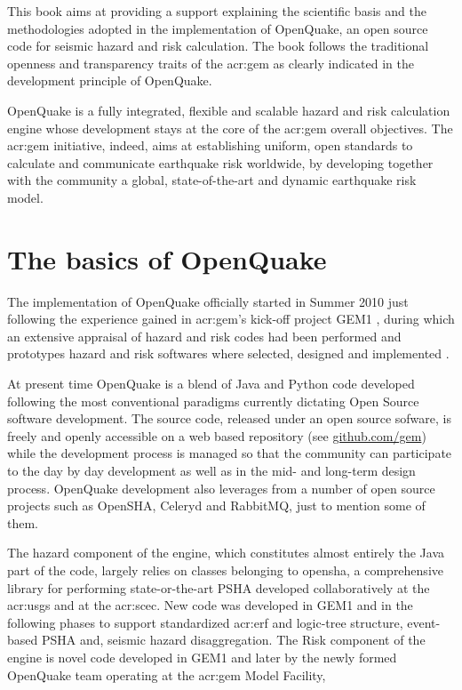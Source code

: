 This book aims at providing a support explaining the scientific basis 
and the methodologies adopted in the implementation of OpenQuake, an open 
source code for seismic hazard and risk calculation. 
%
The book follows the traditional openness and transparency traits of the 
\gls{acr:gem} as clearly indicated in the development principle of 
OpenQuake. 

OpenQuake is a fully integrated, flexible and scalable hazard and risk 
calculation engine whose development stays at the core of the \gls{acr:gem} 
overall objectives.
%
The \gls{acr:gem} initiative, indeed, aims at establishing uniform, open 
standards to calculate and communicate earthquake risk worldwide, by 
developing together with the community a global, state-of-the-art and 
dynamic earthquake risk model. 
%
\section{The basics of OpenQuake}
The implementation of OpenQuake officially started in Summer 2010 just 
following the experience gained in \gls{acr:gem}'s kick-off project GEM1 
\citep{gemfoundation2010}, during which an extensive appraisal of hazard 
and risk codes had been performed \citep{danciu2010,crowley2010}
and prototypes hazard and risk softwares where selected, designed and
implemented \citep{pagani2010,crowley2010a}.

At present time OpenQuake is a blend of Java and Python code developed 
following the most conventional paradigms currently dictating Open Source 
software development. 
The source code, released under an open source sofware,
is freely and openly accessible on a web based repository 
(see \href{http://github.com/gem}{github.com/gem}) while the 
development process is managed so that the community can participate 
to the day by day development as well as in the mid- and long-term 
design process. 
%
OpenQuake development also leverages from a number of open source projects 
such as OpenSHA, Celeryd and RabbitMQ, just to mention some of them.

The hazard component of the engine, which constitutes almost entirely
the Java part of the code, largely relies on classes belonging to 
\gls{opensha}, a comprehensive library for performing state-or-the-art
PSHA developed collaboratively at the \gls{acr:usgs} and at the 
\gls{acr:scec}. New code was developed in GEM1 and in the following 
phases to support standardized \gls{acr:erf} and logic-tree structure, 
event-based PSHA and, seismic hazard disaggregation.
%
The Risk component of the engine is novel code developed in GEM1 and 
later by the newly formed OpenQuake team operating at the \gls{acr:gem} 
Model Facility, 

